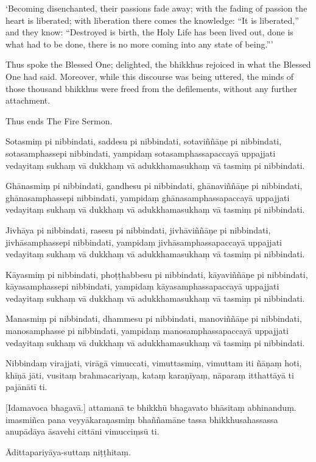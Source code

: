 ‘Becoming disenchanted, their passions fade away; with the fading of
passion the heart is liberated; with liberation there comes the
knowledge: “It is liberated,” and they know: “Destroyed is birth, the
Holy Life has been lived out, done is what had to be done, there is no
more coming into any state of being.”\thinspace ’

\enlargethispage{\baselineskip}

Thus spoke the Blessed One; delighted, the bhikkhus rejoiced in what the
Blessed One had said. Moreover, while this discourse was being uttered, the
minds of those thousand bhikkhus were freed from the defilements,
without any further attachment.

Thus ends The Fire Sermon.

\clearpage

\paliText
\markboth{\paliTitle}{\rightmark}

Sotasmiṃ pi nibbindati, saddesu pi nibbindati, sotaviññāṇe pi
nibbindati, sotasamphassepi nibbindati, yampidaṃ sotasamphassapaccayā
uppajjati vedayitaṃ sukhaṃ vā dukkhaṃ vā adukkhamasukhaṃ vā tasmiṃ pi
nibbindati.

Ghānasmiṃ pi nibbindati, gandhesu pi nibbindati, ghānaviññāṇe pi
nibbindati, ghānasamphassepi nibbindati, yampidaṃ ghānasamphassapaccayā
uppajjati vedayitaṃ sukhaṃ vā dukkhaṃ vā adukkhamasukhaṃ vā tasmiṃ pi
nibbindati.

Jivhāya pi nibbindati, rasesu pi nibbindati, jivhāviññāṇe pi nibbindati,
jivhāsamphassepi nibbindati, yampidaṃ jivhāsamphassapaccayā uppajjati
vedayitaṃ sukhaṃ vā dukkhaṃ vā adukkhamasukhaṃ vā tasmiṃ pi nibbindati.

Kāyasmiṃ pi nibbindati, phoṭṭhabbesu pi nibbindati, kāyaviññāṇe pi
nibbindati, kāyasamphassepi nibbindati, yampidaṃ kāyasamphassapaccayā
uppajjati vedayitaṃ sukhaṃ vā dukkhaṃ vā adukkhamasukhaṃ vā tasmiṃ pi
nibbindati.

Manasmiṃ pi nibbindati, dhammesu pi nibbindati, manoviññāṇe pi
nibbindati, manosamphasse pi nibbindati, yampidaṃ manosamphassapaccayā
uppajjati vedayitaṃ sukhaṃ vā dukkhaṃ vā adukkhamasukhaṃ vā tasmiṃ pi
nibbindati.

Nibbindaṃ virajjati, virāgā vimuccati, vimuttasmiṃ, vimuttam iti ñāṇaṃ
hoti, khīṇā jāti, vusitaṃ brahmacariyaṃ, kataṃ karaṇīyaṃ, nāparaṃ
itthattāyā ti pajānātī ti.

\enlargethispage{\baselineskip}

[Idamavoca bhagavā.] attamanā te bhikkhū bhagavato bhāsitaṃ abhinanduṃ.
imasmiñca pana veyyākaraṇasmiṃ bhaññamāne tassa bhikkhusahassassa
anupādāya āsavehi cittāni vimucciṃsū ti.

Ādittapariyāya-suttaṃ niṭṭhitaṃ.

\resumeNormalText

